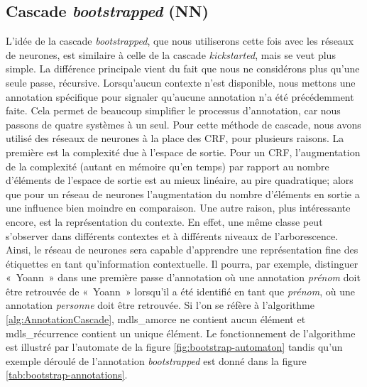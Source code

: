 \documentclass[12pt,a4paper,times,twoside,openright]{report}
\begin{document}
        \subsection{Cascade \textit{bootstrapped} (NN)}
        \label{subsec:bootstrap-parsing}
L'idée de la cascade \textit{bootstrapped}, que nous utiliserons cette fois avec les réseaux de neurones, est similaire à celle de la cascade \textit{kickstarted}, mais se veut plus simple. La différence principale vient du fait que nous ne considérons plus qu'une seule passe, récursive. Lorsqu'aucun contexte n'est disponible, nous mettons une annotation spécifique pour signaler qu'aucune annotation n'a été précédemment faite. Cela permet de beaucoup simplifier le processus d'annotation, car nous passons de quatre systèmes à un seul.
Pour cette méthode de cascade, nous avons utilisé des réseaux de neurones à la place des CRF, pour plusieurs raisons. La première est la complexité due à l'espace de sortie. Pour un CRF, l'augmentation de la complexité (autant en mémoire qu'en temps) par rapport au nombre d'éléments de l'espace de sortie est au mieux linéaire, au pire quadratique; alors que pour un réseau de neurones l'augmentation du nombre d'éléments en sortie a une influence bien moindre en comparaison. Une autre raison, plus intéressante encore, est la représentation du contexte. En effet, une même classe peut s'observer dans différents contextes et à différents niveaux de l'arborescence. Ainsi, le réseau de neurones sera capable d'apprendre une représentation fine des étiquettes en tant qu'information contextuelle. Il pourra, par exemple, distinguer «\ Yoann\ » dans une première passe d'annotation où une annotation \emph{prénom} doit être retrouvée de «\ Yoann\ » lorsqu'il a été identifié en tant que \emph{prénom}, où une annotation \emph{personne} doit être retrouvée. Si l'on se réfère à l'algorithme \ref{alg:AnnotationCascade}, mdls\_amorce ne contient aucun élément et mdls\_récurrence contient un unique élément. Le fonctionnement de l'algorithme est illustré par l'automate de la figure \ref{fig:bootstrap-automaton} tandis qu'un exemple déroulé de l'annotation \textit{bootstrapped} est donné dans la figure \ref{tab:bootstrap-annotations}.
\end{document}
